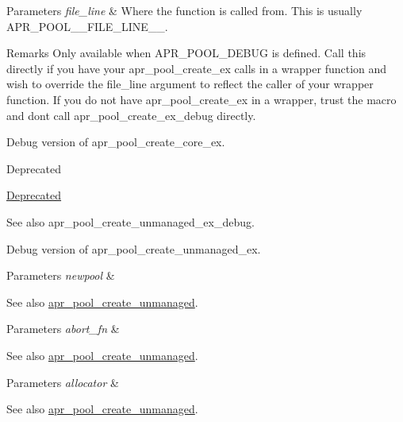 \begin{DoxyParams}{Parameters}
{\em file\+\_\+line} & Where the function is called from. This is usually A\+P\+R\+\_\+\+P\+O\+O\+L\+\_\+\+\_\+\+F\+I\+L\+E\+\_\+\+L\+I\+N\+E\+\_\+\+\_\+. \\
\hline
\end{DoxyParams}
\begin{DoxyRemark}{Remarks}
Only available when A\+P\+R\+\_\+\+P\+O\+O\+L\+\_\+\+D\+E\+B\+UG is defined. Call this directly if you have your apr\+\_\+pool\+\_\+create\+\_\+ex calls in a wrapper function and wish to override the file\+\_\+line argument to reflect the caller of your wrapper function. If you do not have apr\+\_\+pool\+\_\+create\+\_\+ex in a wrapper, trust the macro and don\textquotesingle{}t call apr\+\_\+pool\+\_\+create\+\_\+ex\+\_\+debug directly.
\end{DoxyRemark}
Debug version of apr\+\_\+pool\+\_\+create\+\_\+core\+\_\+ex. \begin{DoxyRefDesc}{Deprecated}
\item[\hyperlink{deprecated__deprecated000042}{Deprecated}]\end{DoxyRefDesc}
\begin{DoxySeeAlso}{See also}
apr\+\_\+pool\+\_\+create\+\_\+unmanaged\+\_\+ex\+\_\+debug.
\end{DoxySeeAlso}
Debug version of apr\+\_\+pool\+\_\+create\+\_\+unmanaged\+\_\+ex. 
\begin{DoxyParams}{Parameters}
{\em newpool} & \\
\hline
\end{DoxyParams}
\begin{DoxySeeAlso}{See also}
\hyperlink{group__apr__pools_ga03a06feb239bed9edd79a4f59679d56b}{apr\+\_\+pool\+\_\+create\+\_\+unmanaged}. 
\end{DoxySeeAlso}

\begin{DoxyParams}{Parameters}
{\em abort\+\_\+fn} & \\
\hline
\end{DoxyParams}
\begin{DoxySeeAlso}{See also}
\hyperlink{group__apr__pools_ga03a06feb239bed9edd79a4f59679d56b}{apr\+\_\+pool\+\_\+create\+\_\+unmanaged}. 
\end{DoxySeeAlso}

\begin{DoxyParams}{Parameters}
{\em allocator} & \\
\hline
\end{DoxyParams}
\begin{DoxySeeAlso}{See also}
\hyperlink{group__apr__pools_ga03a06feb239bed9edd79a4f59679d56b}{apr\+\_\+pool\+\_\+create\+\_\+unmanaged}. 
\end{DoxySeeAlso}

